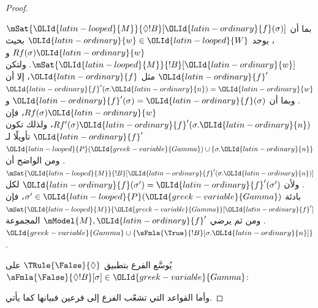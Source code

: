 \documentclass[../../../include/open-logic-section]{subfiles}
\begin{document}
\begin{proof}
\begin{enumerate}
{{  بما أن $\mSat{{\OLId{latin-looped}{M}}}{\Diamond !B}[{\OLId{latin-ordinary}{f}}(\sigma)]$، يوجد ${\OLId{latin-ordinary}{w}} \in {\OLId{latin-looped}{W}}$ بحيث
  $Rf(\sigma){\OLId{latin-ordinary}{w}}$ و$\mSat{{\OLId{latin-looped}{M}}}{!B}[{\OLId{latin-ordinary}{w}}]$. ولتكن ${\OLId{latin-ordinary}{f}}'$ مثل ${\OLId{latin-ordinary}{f}}$، إلا أن
  ${\OLId{latin-ordinary}{f}}'(\sigma.{\OLId{latin-ordinary}{n}}) = {\OLId{latin-ordinary}{w}}$. وبما أن ${\OLId{latin-ordinary}{f}}'(\sigma) = {\OLId{latin-ordinary}{f}}(\sigma)$ و
  $Rf(\sigma){\OLId{latin-ordinary}{w}}$، فإن $Rf'(\sigma){\OLId{latin-ordinary}{f}}'(\sigma.{\OLId{latin-ordinary}{n}})$، ولذلك تكون ${\OLId{latin-ordinary}{f}}'$
  تأويلًا لـ${\OLId{latin-looped}{P}}({\OLId{greek-variable}{Gamma}}) \cup \{\sigma.{\OLId{latin-ordinary}{n}}\}$. ومن الواضح أن
  $\mSat{{\OLId{latin-looped}{M}}}{!B}[{\OLId{latin-ordinary}{f}}'(\sigma.{\OLId{latin-ordinary}{n}})]$. ولأن ${\OLId{latin-ordinary}{f}}(\sigma') = {\OLId{latin-ordinary}{f}}'(\sigma')$ لكل
  بادئة $\sigma' \in {\OLId{latin-looped}{P}}({\OLId{greek-variable}{Gamma}})$، فإن $\mSat{{\OLId{latin-looped}{M}}}{{\OLId{greek-variable}{Gamma}}}[{\OLId{latin-ordinary}{f}}']$. ومن ثم
  يرضي $\mModel{M}, {\OLId{latin-ordinary}{f}}'$ المجموعة ${\OLId{greek-variable}{Gamma}} \cup
  \{\sFmla{\True}{!B}[\sigma.{\OLId{latin-ordinary}{n}}]\}$.}
\item يُوسَّع الفرع بتطبيق $\TRule{\False}{\Diamond}$ على
  $\sFmla{\False}{\Diamond !B}[\sigma] \in {\OLId{greek-variable}{Gamma}}$:
  }{}
\end{enumerate}
وأما القواعد التي تشعّب الفرع إلى فرعين فبيانها كما يأتي.

\end{proof}
\end{document}
